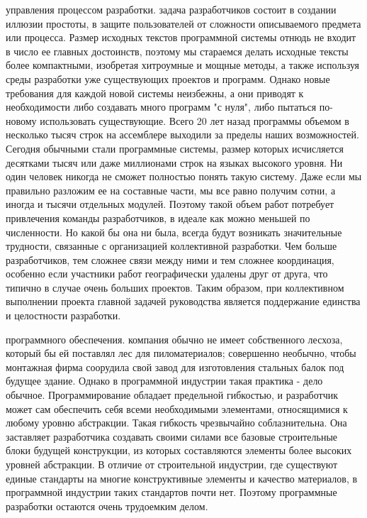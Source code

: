 \documentclass[11pt]{article}
\begin{document}
 управления процессом разработки.  задача разработчиков состоит в создании иллюзии простоты, в защите пользователей от сложности описываемого предмета или процесса. Размер исходных текстов программной системы отнюдь не входит в число ее главных достоинств, поэтому мы стараемся делать исходные тексты более компактными, изобретая хитроумные и мощные методы, а также используя среды разработки уже существующих проектов и программ. Однако новые требования для каждой новой системы неизбежны, а они приводят к необходимости либо создавать много программ "с нуля", либо пытаться по-новому использовать существующие. Всего 20 лет назад программы объемом в несколько тысяч строк на ассемблере выходили за пределы наших возможностей. Сегодня обычными стали программные системы, размер которых исчисляется десятками тысяч или даже миллионами строк на языках высокого уровня. Ни один человек никогда не сможет полностью понять такую систему. Даже если мы правильно разложим ее на составные части, мы все равно получим сотни, а иногда и тысячи отдельных модулей. Поэтому такой объем работ потребует привлечения команды разработчиков, в идеале как можно меньшей по численности. Но какой бы она ни была, всегда будут возникать значительные трудности, связанные с организацией коллективной разработки. Чем больше разработчиков, тем сложнее связи между ними и тем сложнее координация, особенно если участники работ географически удалены друг от друга, что типично в случае очень больших проектов. Таким образом, при коллективном выполнении проекта главной задачей руководства является поддержание единства и целостности разработки. \bigskip

 программного обеспечения.  компания обычно не имеет собственного лесхоза, который бы ей поставлял лес для пиломатериалов; совершенно необычно, чтобы монтажная фирма соорудила свой завод для изготовления стальных балок под будущее здание. Однако в программной индустрии такая практика - дело обычное. Программирование обладает предельной гибкостью, и разработчик может сам обеспечить себя всеми необходимыми элементами, относящимися к любому уровню абстракции. Такая гибкость чрезвычайно соблазнительна. Она заставляет разработчика создавать своими силами все базовые строительные блоки будущей конструкции, из которых составляются элементы более высоких уровней абстракции. В отличие от строительной индустрии, где существуют единые стандарты на многие конструктивные элементы и качество материалов, в программной индустрии таких стандартов почти нет. Поэтому программные разработки остаются очень трудоемким делом. \bigskip
\end{document}
